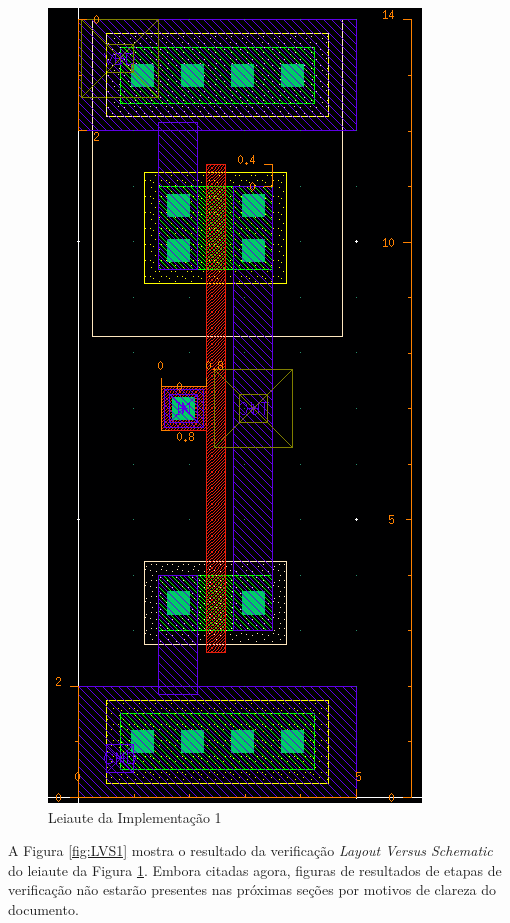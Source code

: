 \documentclass{iiufrgs}
\begin{document}
\begin{figure}[htbp]
    \centering
    \caption{Leiaute da Implementação 1}
    \includegraphics[scale=0.8]{images/layout1.png}

    \label{fig:leiaute1}
\end{figure}

A Figura \ref{fig:LVS1} mostra o resultado da verificação \textit{Layout Versus Schematic} do leiaute da Figura \ref{fig:leiaute1}. Embora citadas agora, figuras de resultados de etapas de verificação não estarão presentes nas próximas seções por motivos de clareza do documento.
\end{document}
